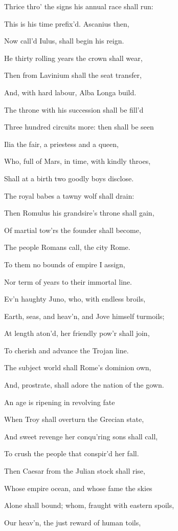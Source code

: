 Thrice thro’ the signs his annual race shall run:

This is his time prefix’d. Ascanius then,

Now call’d Iulus, shall begin his reign.

He thirty rolling years the crown shall wear,

Then from Lavinium shall the seat transfer,

And, with hard labour, Alba Longa build.

The throne with his succession shall be fill’d

Three hundred circuits more: then shall be seen

Ilia the fair, a priestess and a queen,

Who, full of Mars, in time, with kindly throes,

Shall at a birth two goodly boys disclose.

The royal babes a tawny wolf shall drain:

Then Romulus his grandsire’s throne shall gain,

Of martial tow’rs the founder shall become,

The people Romans call, the city Rome.

To them no bounds of empire I assign,

Nor term of years to their immortal line.

Ev’n haughty Juno, who, with endless broils,

Earth, seas, and heav’n, and Jove himself turmoils;

At length aton’d, her friendly pow’r shall join,

To cherish and advance the Trojan line.

The subject world shall Rome’s dominion own,

And, prostrate, shall adore the nation of the gown.

An age is ripening in revolving fate

When Troy shall overturn the Grecian state,

And sweet revenge her conqu’ring sons shall call,

To crush the people that conspir’d her fall.

Then Caesar from the Julian stock shall rise,

Whose empire ocean, and whose fame the skies

Alone shall bound; whom, fraught with eastern spoils,

Our heav’n, the just reward of human toils,


